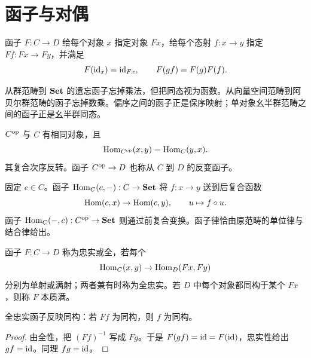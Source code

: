 \section{函子与对偶}
\begin{definition}[函子]
函子 $F:C\to D$ 给每个对象 $x$ 指定对象 $Fx$，给每个态射 $f:x\to y$ 指定 $Ff:Fx\to Fy$，并满足
\[
F(\operatorname{id}_x)=\operatorname{id}_{Fx},\qquad F(gf)=F(g)F(f).
\]
\end{definition}
\begin{example}
从群范畴到 $\mathbf{Set}$ 的遗忘函子忘掉乘法，但把同态视为函数。从向量空间范畴到阿贝尔群范畴的函子忘掉数乘。偏序之间的函子正是保序映射；单对象幺半群范畴之间的函子正是幺半群同态。
\end{example}
\begin{definition}[对偶范畴]
$C^{\mathrm{op}}$ 与 $C$ 有相同对象，且
\[
\operatorname{Hom}_{C^{\mathrm{op}}}(x,y)=\operatorname{Hom}_C(y,x).
\]
其复合次序反转。函子 $C^{\mathrm{op}}\to D$ 也称从 $C$ 到 $D$ 的反变函子。
\end{definition}
\begin{example}[同态函子]
固定 $c\in C$。函子 $\operatorname{Hom}_C(c,-):C\to\mathbf{Set}$ 将 $f:x\to y$ 送到后复合函数
\[
\operatorname{Hom}(c,x)\to\operatorname{Hom}(c,y),\qquad u\mapsto f\circ u.
\]
函子 $\operatorname{Hom}_C(-,c):C^{\mathrm{op}}\to\mathbf{Set}$ 则通过前复合变换。函子律恰由原范畴的单位律与结合律给出。
\end{example}
\begin{definition}[全忠实与本质满]
函子 $F:C\to D$ 称为忠实或全，若每个
\[
\operatorname{Hom}_C(x,y)\to\operatorname{Hom}_D(Fx,Fy)
\]
分别为单射或满射；两者兼有时称为全忠实。若 $D$ 中每个对象都同构于某个 $Fx$，则称 $F$ 本质满。
\end{definition}
\begin{lemma}
全忠实函子反映同构：若 $Ff$ 为同构，则 $f$ 为同构。
\end{lemma}
\begin{proof}
由全性，把 $(Ff)^{-1}$ 写成 $Fg$。于是 $F(gf)=\operatorname{id}=F(\operatorname{id})$，忠实性给出 $gf=\operatorname{id}$。同理 $fg=\operatorname{id}$。
\end{proof}

